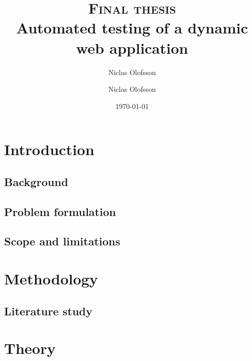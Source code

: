 \documentclass[a4paper]{report}
\author{Niclas Olofsson}
\title{\textsc{Final thesis}\\\Huge\textbf{Automated testing of a dynamic web application}}
\author{Niclas Olofsson}
\date{\today}
\begin{document}
\renewcommand{\abstractname}{Acknowledgments}
\renewcommand{\lstlistingname}{Code listing}

\maketitle
\newpage

\begin{abstract}

\end{abstract}

\begin{abstract}

\end{abstract}

\tableofcontents
\thispagestyle{empty} %
\newpage

\setcounter{page}{1}

\chapter{Introduction}

  \section{Background}
  

  \section{Problem formulation}
  

  \section{Scope and limitations}
  


\chapter{Methodology}
  

  \section{Literature study}
  


\chapter{Theory}
\end{document}
